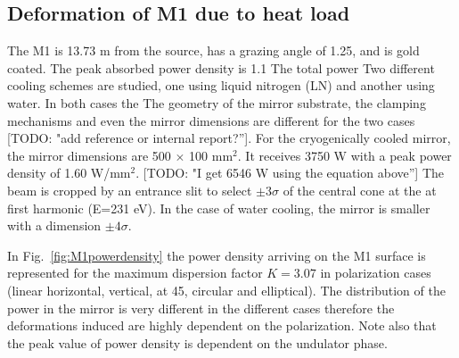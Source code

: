 \documentclass[]{spie}  %
\newcommand{\todo}[1]{{\color{red}[TODO: "#1'']}}
\begin{document}
\subsection{Deformation of M1 due to heat load}


The M1 is 13.73 m from the source, has a grazing angle of 1.25\textdegree, and is gold coated. The peak absorbed power density is 1.1  The total power Two different cooling schemes are studied, one using liquid nitrogen (LN) and another using water. In both cases the The geometry of the mirror substrate, the clamping mechanisms and even the mirror dimensions are different for the two cases \todo{add reference or internal report?}. For the cryogenically cooled mirror, the mirror dimensions are 500 $\times$ 100 mm$^2$. It receives 3750 W with a peak power density of 1.60 W/mm$^2$. \todo{I get 6546 W using the equation above} The beam is cropped by an entrance slit to select $\pm 3 \sigma$ of the central cone at the at first harmonic (E=231 eV). In the case of water cooling, the mirror is smaller with a dimension $\pm 4 \sigma$. 

In Fig.~\ref{fig:M1powerdensity} the power density arriving on the M1 surface is represented for the maximum dispersion factor $K=3.07$ in polarization cases (linear horizontal, vertical, at 45\textdegree, circular and elliptical). The distribution of the power in the mirror is very different in the different cases therefore the deformations induced are highly dependent on the polarization. Note also that the peak value of power density is dependent on the undulator phase.
\end{document}
